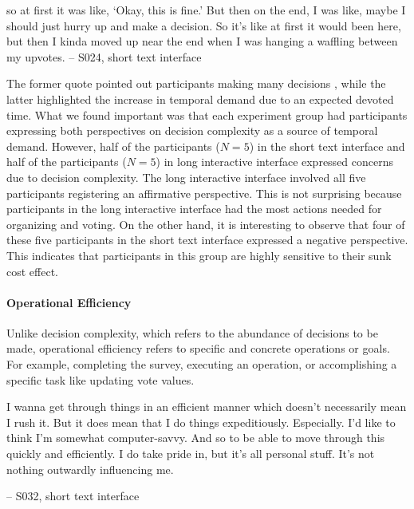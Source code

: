 \begin{displayquote}
\bracketellipsis so at first it was like, `Okay, this is fine.' But then on the end, I was like, maybe I should just hurry up and make a decision. So it's like at first it would been here, but then I kinda moved up near the end when I was hanging a waffling between my upvotes.
\noindent \hfill -- S024, short text interface
\end{displayquote}

The former quote pointed out participants making many decisions , while the latter highlighted the increase in temporal demand due to an expected devoted time. What we found important was that each experiment group had participants expressing both perspectives on decision complexity as a source of temporal demand. However, half of the participants ($N=5$) in the short text interface and half of the participants ($N=5$) in long interactive interface expressed concerns due to decision complexity. The long interactive interface involved all five participants registering an affirmative perspective. This is not surprising because participants in the long interactive interface had the most actions needed for organizing and voting. On the other hand, it is interesting to observe that four of these five participants in the short text interface expressed a negative perspective. This indicates that participants in this group are highly sensitive to their sunk cost effect.

\paragraph{Operational Efficiency}
Unlike decision complexity, which refers to the abundance of decisions to be made, operational efficiency refers to specific and concrete operations or goals. For example, completing the survey, executing an operation, or accomplishing a specific task like updating vote values.

\begin{displayquote}
I wanna get through things in an efficient manner which doesn't necessarily mean I rush it. But it does mean that I do things expeditiously. Especially. I'd like to think I'm somewhat computer-savvy. And so to be able to move through this quickly and efficiently. I do take pride in, but it's all personal stuff. It's not nothing outwardly influencing me. 
        
\noindent \hfill -- S032, short text interface
\end{displayquote}

